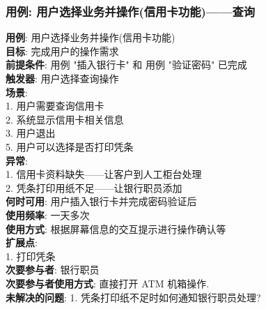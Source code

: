 \documentclass[UTF8]{article}
\begin{document}
	
\subsubsection{用例: 用户选择业务并操作(信用卡功能)——查询}
\noindent
\textbf{用例}: 用户选择业务并操作(信用卡功能)
\\
\textbf{目标}: 完成用户的操作需求
\\
\textbf{前提条件}: 用例 "插入银行卡" 和 用例 "验证密码" 已完成
\\
\textbf{触发器}: 用户选择查询操作
\\
\textbf{场景}: \\
	\hspace*{2em} 1. 用户需要查询信用卡 \\
	\hspace*{2em} 2. 系统显示信用卡相关信息 \\
	\hspace*{2em} 3. 用户退出 \\
	\hspace*{2em} 5. 用户可以选择是否打印凭条 \\
\textbf{异常}: \\
	\hspace*{2em} 1. 信用卡资料缺失——让客户到人工柜台处理 \\
	\hspace*{2em} 2. 凭条打印用纸不足——让银行职员添加 \\
\textbf{何时可用}: 用户插入银行卡并完成密码验证后
\\
\textbf{使用频率}: 一天多次
\\
\textbf{使用方式}: 根据屏幕信息的交互提示进行操作确认等 \\
\textbf{扩展点}: \\
	\hspace*{2em}1. 打印凭条 \\
\textbf{次要参与者}: 银行职员
\\
\textbf{次要参与者使用方式}: 直接打开 ATM 机箱操作.
\\
\textbf{未解决的问题}: 
	\hspace*{2em} 1. 凭条打印纸不足时如何通知银行职员处理? \\
		
		
\end{document}
